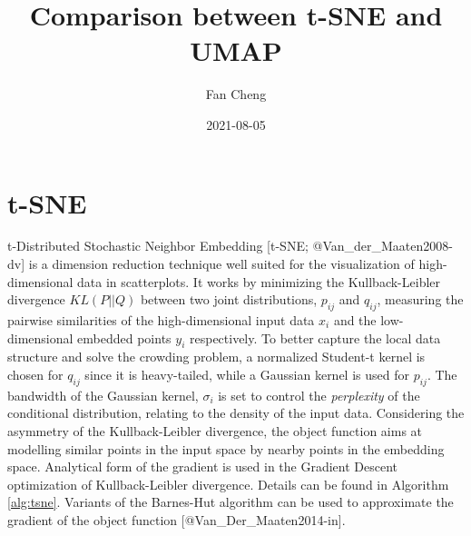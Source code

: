 \documentclass[
]{article}
\title{Comparison between t-SNE and UMAP}
\author{Fan Cheng}
\date{2021-08-05}
\begin{document}
\maketitle

\hypertarget{t-sne}{%
\section{t-SNE}\label{t-sne}}

t-Distributed Stochastic Neighbor Embedding {[}t-SNE; @Van\_der\_Maaten2008-dv{]} is a dimension reduction technique well suited for the visualization of high-dimensional data in scatterplots. It works by minimizing the Kullback-Leibler divergence \(KL(P||Q)\) between two joint distributions, \(p_{ij}\) and \(q_{ij}\), measuring the pairwise similarities of the high-dimensional input data \(x_i\) and the low-dimensional embedded points \(y_i\) respectively.
To better capture the local data structure and solve the crowding problem, a normalized Student-t kernel is chosen for \(q_{ij}\) since it is heavy-tailed, while a Gaussian kernel is used for \(p_{ij}\). The bandwidth of the Gaussian kernel, \(\sigma_i\) is set to control the \emph{perplexity} of the conditional distribution, relating to the density of the input data. Considering the asymmetry of the Kullback-Leibler divergence, the object function aims at modelling similar points in the input space by nearby points in the embedding space. Analytical form of the gradient is used in the Gradient Descent optimization of Kullback-Leibler divergence. Details can be found in Algorithm \ref{alg:tsne}. Variants of the Barnes-Hut algorithm can be used to approximate the gradient of the object function {[}@Van\_Der\_Maaten2014-in{]}.
\end{document}

